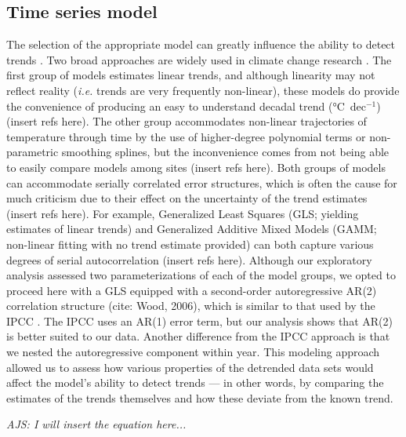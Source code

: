 \documentclass{ametsoc}
\begin{document}
\subsection{Time series model}
The selection of the appropriate model can greatly influence the ability to detect trends \citet{Franzke2012}. Two broad approaches are widely used in climate change research \citep{IPCC2013}. The first group of models estimates linear trends, and although linearity may not reflect reality (\emph{i.e.} trends are very frequently non-linear), these models do provide the convenience of producing an easy to understand decadal trend (\si{\degreeCelsius}~dec$^{-1}$) (insert refs here). The other group accommodates non-linear trajectories of temperature through time by the use of higher-degree polynomial terms or non-parametric smoothing splines, but the inconvenience comes from not being able to easily compare models among sites (insert refs here). Both groups of models can accommodate serially correlated error structures, which is often the cause for much criticism due to their effect on the uncertainty of the trend estimates (insert refs here). For example, Generalized Least Squares (GLS; yielding estimates of linear trends) and Generalized Additive Mixed Models (GAMM; non-linear fitting with no trend estimate provided) can both capture various degrees of serial autocorrelation (insert refs here). Although our exploratory analysis assessed two parameterizations of each of the model groups, we opted to proceed here with a GLS equipped with a second-order autoregressive AR(2) correlation structure (cite: Wood, 2006), which is similar to that used by the IPCC \citep{IPCC2013}. The IPCC uses an AR(1) error term, but our analysis shows that AR(2) is better suited to our data. Another difference from the IPCC approach is that we nested the autoregressive component within year. This modeling approach allowed us to assess how various properties of the detrended data sets would affect the model’s ability to detect trends --- in other words, by comparing the estimates of the trends themselves and how these deviate from the known trend.

\emph{AJS: I will insert the equation here...}
\end{document}
